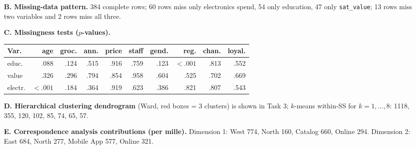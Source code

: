 \documentclass[10pt,a4paper]{article}
\begin{document}
\textbf{B. Missing-data pattern.} 384 complete rows; 60 rows miss only electronics spend, 54 only education, 47 only \texttt{sat\_value}; 13 rows miss two variables and 2 rows miss all three.

\textbf{C. Missingness tests ($p$-values).}

\begin{table}[H]
\centering
\begin{tabular}{lrrrrrrrrr}
\toprule
Var. & age & groc. & ann. & price & staff & gend. & reg. & chan. & loyal. \\
\midrule
educ.   & .088 & .124 & .515 & .916 & .759 & .123 & $\mathbf{<.001}$ & .813 & .552 \\
value   & .326 & .296 & .794 & .854 & .958 & .604 & .525 & .702 & .669 \\
electr. & $\mathbf{<.001}$ & .184 & .364 & .919 & .623 & .386 & .821 & .807 & .543 \\
\bottomrule
\end{tabular}
\end{table}

\textbf{D. Hierarchical clustering dendrogram} (Ward, red boxes = 3 clusters) is shown in Task 3; $k$-means within-SS for $k = 1, \dots, 8$: 1118, 355, 120, 102, 85, 74, 65, 57.

\textbf{E. Correspondence analysis contributions (per mille).} Dimension 1: West 774, North 160, Catalog 660, Online 294. Dimension 2: East 684, North 277, Mobile App 577, Online 321.
\end{document}
